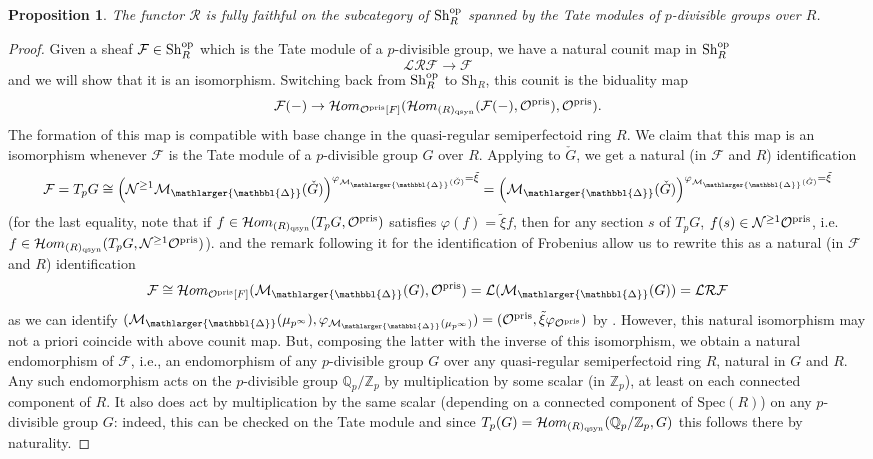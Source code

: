 \documentclass{amsart}
\newcommand{\prism}{{\mathlarger{\mathbbl{\Delta}}}}
\theoremstyle{plain}
\newtheorem{proposition}[theorem]{Proposition}
\theoremstyle{definition}
\newcommand{\pris}{\mathrm{pris}}
\newcommand{\Q}{\mathbb{Q}}
\newcommand{\Spec}{\mathrm{Spec}}
\newcommand{\tilxi}{\tilde{\xi}}
\newcommand{\Z}{\mathbb{Z}}
\newcommand{\blue}[1]{{\color{black}#1}}
\begin{document}
\begin{proposition}
\label{right_adjoint_R_ff}
The functor $\mathcal{R}$ is fully faithful on the subcategory of $\mathrm{Sh}_R^{\rm op}$ spanned by the Tate modules of $p$-divisible groups over $R$.
\end{proposition}
\begin{proof}
Given a sheaf $\mathcal{F} \in \mathrm{Sh}_R^{\rm op}$ which is the Tate module of a $p$-divisible group, we have a natural counit map in $\mathrm{Sh}_R^{\rm op}$
$$
\mathcal{L}\mathcal{R}\mathcal{F} \to \mathcal{F}
$$
and we will show that it is an isomorphism. Switching back from $\mathrm{Sh}_R^{\rm op}$ to $\mathrm{Sh}_R$, this counit is the biduality map
$$
\mathcal{F}(-) \to \mathcal{H}om_{\mathcal{O}^{\rm pris}[F]}(\mathcal{H}om_{(R)_{\rm qsyn}}(\mathcal{F}(-),\mathcal{O}^{\rm pris}),\mathcal{O}^{\rm pris}).
$$
The formation of this map is compatible with base change in the quasi-regular semiperfectoid ring $R$. We claim that this map is an isomorphism whenever $\mathcal{F}$ is the Tate module of a $p$-divisible group $G$ over $R$. Applying  to $\check{G}$, we get a natural (in $\mathcal{F}$ and $R$) identification 
$$
\mathcal{F}=T_p G \cong \left(\mathcal{N}^{\geq 1} \mathcal{M}_\prism(\check{G})\right)^{\varphi_{\mathcal{M}_\prism(\check{G})}=\tilxi} = \left(\mathcal{M}_\prism(\check{G})\right)^{\varphi_{\mathcal{M}_\prism(\check{G})}=\tilxi}
$$
\blue{(for the last equality, note that if $f \in \mathcal{H}om_{(R)_{\rm qsyn}}(T_pG, \mathcal{O}^{\rm pris})$ satisfies $\varphi(f)=\tilxi f$, then for any section $s$ of $T_p G$, $f(s) \in  \mathcal{N}^{\geq 1}\mathcal{O}^{\rm pris}$, i.e. $f \in \mathcal{H}om_{(R)_{\rm qsyn}}(T_pG, \mathcal{N}^{\geq 1}\mathcal{O}^{\rm pris})$).}  and the remark following it for the identification of Frobenius allow us to rewrite this as a natural (in $\mathcal{F}$ and $R$) identification
$$
\mathcal{F} \cong \mathcal{H}om_{\mathcal{O}^{\rm pris}[F]}(\mathcal{M}_\prism(G),\mathcal{O}^{\rm pris})= \mathcal{L}(\mathcal{M}_\prism(G)) = \mathcal{L} \mathcal{R} \mathcal{F}
$$
as we can identify $(\mathcal{M}_\prism(\mu_{p^\infty}), \varphi_{\mathcal{M}_\prism(\mu_{p^\infty})})=(\mathcal{O}^\pris, \tilxi \varphi_{\mathcal{O}^\pris})$ by . However, this natural isomorphism may not a priori coincide with above counit map. But, composing the latter with the inverse of this isomorphism, we obtain a natural endomorphism of $\mathcal{F}$, i.e., an endomorphism of any $p$-divisible group $G$ over any quasi-regular semiperfectoid ring $R$, natural in $G$ and $R$. Any such endomorphism acts on the $p$-divisible group $\Q_p/\Z_p$ by multiplication by some scalar (in $\Z_p$), at least on each connected component of $R$. It also does act by multiplication by the same scalar (depending on a connected component of $\Spec(R)$) on any $p$-divisible group $G$: indeed, this can be checked on the Tate module and since $T_p(G)=\mathcal{H}om_{(R)_{\rm qsyn}}(\Q_p/\Z_p,G)$ this follows there by naturality. 


\end{proof}
\end{document}
